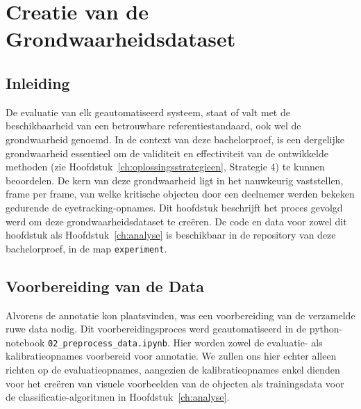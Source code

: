 \chapter{Creatie van de Grondwaarheidsdataset}
\label{ch:grondwaarheid}

\section{Inleiding}

De evaluatie van elk geautomatiseerd systeem, staat of valt met de beschikbaarheid 
van een betrouwbare referentiestandaard, ook wel de grondwaarheid genoemd.
In de context van deze bachelorproef, is een dergelijke grondwaarheid essentieel om de validiteit en effectiviteit 
van de ontwikkelde methoden (zie Hoofdstuk~\ref{ch:oplossingsstrategieen}, Strategie 4) te kunnen beoordelen.
De kern van deze grondwaarheid ligt in het nauwkeurig vaststellen, frame per frame, van welke kritische objecten 
door een deelnemer werden bekeken gedurende de eyetracking-opnames.
Dit hoofdstuk beschrijft het proces gevolgd werd om deze grondwaarheidsdataset te creëren.
De code en data voor zowel dit hoofdstuk als Hoofdstuk~\ref{ch:analyse} is beschikbaar in de repository van deze bachelorproef,
in de map \texttt{experiment}.

\section{Voorbereiding van de Data}

Alvorens de annotatie kon plaatsvinden, was een voorbereiding van de verzamelde ruwe data nodig.
Dit voorbereidingsproces werd geautomatiseerd in de python-notebook \texttt{02\_preprocess\_data.ipynb}.
Hier worden zowel de evaluatie- als kalibratieopnames voorbereid voor annotatie. 
We zullen ons hier echter alleen richten op de evaluatieopnames,
aangezien de kalibratieopnames enkel dienden voor het creëren van visuele voorbeelden van de objecten
als trainingsdata voor de classificatie-algoritmen in Hoofdstuk~\ref{ch:analyse}.

